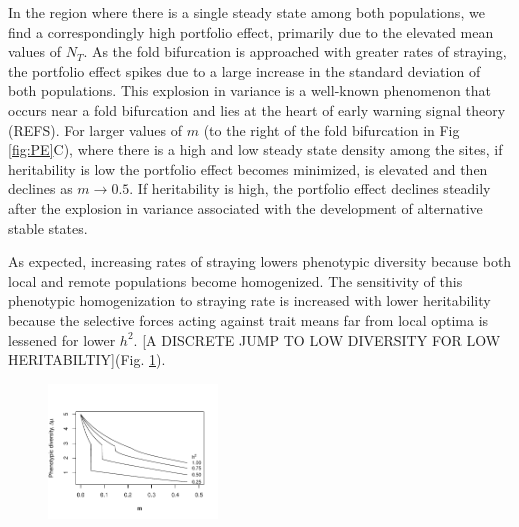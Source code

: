 \documentclass[twocolumn,preprintnumbers,amsmath,amssymb,superscriptaddress]{revtex4}
\begin{document}
In the region where there is a single steady state among both populations, we find a correspondingly high portfolio effect, primarily due to the elevated mean values of $N_T$.
As the fold bifurcation is approached with greater rates of straying, the portfolio effect spikes due to a large increase in the standard deviation of both populations.
This explosion in variance is a well-known phenomenon that occurs near a fold bifurcation and lies at the heart of early warning signal theory (REFS).
For larger values of $m$ (to the right of the fold bifurcation in Fig \ref{fig:PE}C), where there is a high and low steady state density among the sites, if heritability is low the portfolio effect becomes minimized, is elevated and then declines as $m\rightarrow 0.5$.
If heritability is high, the portfolio effect declines steadily after the explosion in variance associated with the development of alternative stable states.

As expected, increasing rates of straying lowers phenotypic diversity because both local and remote populations become homogenized.
The sensitivity of this phenotypic homogenization to straying rate is increased with lower heritability because the selective forces acting against trait means far from local optima is lessened for lower $h^2$.
[A DISCRETE JUMP TO LOW DIVERSITY FOR LOW HERITABILTIY](Fig. \ref{fig:traitdiff}).

\begin{figure}
\centering
\includegraphics[width=0.4\textwidth]{figs/fig_traitdiff.pdf}
\caption{
} \label{fig:traitdiff}
\end{figure}
\end{document}
